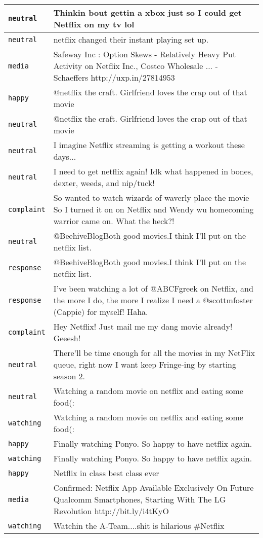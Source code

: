 \begin{center}
\begin{longtable}{|l|p{120mm}|}
      \tabularnewline\hline
         \texttt{neutral} & Thinkin bout gettin a xbox just so I could get Netflix on my tv lol
      \tabularnewline\hline
         \texttt{neutral} & netflix changed their instant playing set up.
      \tabularnewline\hline
         \texttt{media} & Safeway Inc : Option Skews - Relatively Heavy Put Activity on Netflix Inc., Costco Wholesale ... - Schaeffers http://uxp.in/27814953
      \tabularnewline\hline
         \texttt{happy} & @netflix the craft. Girlfriend loves the crap out of that movie
      \tabularnewline\hline
         \texttt{neutral} & @netflix the craft. Girlfriend loves the crap out of that movie
      \tabularnewline\hline
         \texttt{neutral} & I imagine Netflix streaming is getting a workout these days...
      \tabularnewline\hline
         \texttt{neutral} & I need to get netflix again! Idk what happened in bones, dexter, weeds, and nip/tuck!
      \tabularnewline\hline
         \texttt{complaint} & So wanted to watch wizards of waverly place the movie So I turned it on on Netflix and Wendy wu homecoming warrior came on. What the heck?!
      \tabularnewline\hline
         \texttt{neutral} & @BeehiveBlogBoth good movies.I think I'll put on the netflix list.
      \tabularnewline\hline
         \texttt{response} & @BeehiveBlogBoth good movies.I think I'll put on the netflix list.
      \tabularnewline\hline
         \texttt{response} & I've been watching a lot of @ABCFgreek on Netflix, and the more I do, the more I realize I need a @scottmfoster (Cappie) for myself! Haha.
      \tabularnewline\hline
         \texttt{complaint} & Hey Netflix! Just mail me my dang movie already! Geeesh!
      \tabularnewline\hline
         \texttt{neutral} & There'll be time enough for all the movies in my NetFlix queue, right now I want keep Fringe-ing by starting season 2.
      \tabularnewline\hline
         \texttt{neutral} & Watching a random movie on netflix and eating some food(:
      \tabularnewline\hline
         \texttt{watching} & Watching a random movie on netflix and eating some food(:
      \tabularnewline\hline
         \texttt{happy} & Finally watching Ponyo. So happy to have netflix again.
      \tabularnewline\hline
         \texttt{watching} & Finally watching Ponyo. So happy to have netflix again.
      \tabularnewline\hline
         \texttt{happy} & Netflix in class best class ever
      \tabularnewline\hline
         \texttt{media} & Confirmed: Netflix App Available Exclusively On Future Qualcomm Smartphones, Starting With The LG Revolution http://bit.ly/i4tKyO
      \tabularnewline\hline
         \texttt{watching} & Watchin the A-Team....shit is hilarious \#Netflix

\end{longtable}
\end{center}
